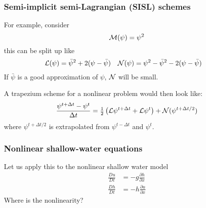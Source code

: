 \documentclass[aspectratio=43,9pt]{beamer}
\begin{document}
\begin{frame}
	\frametitle{Semi-implicit semi-Lagrangian (SISL) schemes}
	\begin{myitemize}{3ex}
		\item For example, consider
			\begin{equation*}
				{\cal M}(\psi)=\psi^2
			\end{equation*}
			this can be split up like
			\begin{align*}
				{\cal L}(\psi)&=\bar\psi^2+2(\psi-\bar{\psi})	& {\cal N}(\psi)&=\psi^2-\bar\psi^2-2(\psi-\bar{\psi})
			\end{align*}
			If $\bar \psi$ is a good approximation of $\psi$, $\cal N$ will be small.
		\item A trapezium scheme for a nonlinear problem would then look like:
			\begin{equation*}
				\frac{\psi^{t+\Delta t} - \psi^t}{\Delta t} =
				{\textstyle\frac{1}{2}} \left(  {\cal L} \psi^{t+\Delta t} + {\cal L}\psi^{t} \right)
				+ {\cal N}(\psi^{t+\Delta t/2})
			\end{equation*}
			where $\psi^{t+\Delta t/2}$ is extrapolated from $\psi^{t-\Delta t}$ and $\psi^t$.
	\end{myitemize}
\end{frame}
%
%
\begin{frame}
	\frametitle{Nonlinear shallow-water equations}
	\begin{myitemize}{2ex}
		\item Let us apply this to the nonlinear shallow water model
			\begin{align*}
				\frac{D u}{D t} &= -g \frac{\partial h}{\partial x} \\
				\frac{D h}{D t} &= - h \frac{\partial u}{\partial x}
			\end{align*}
			Where is the nonlinearity?
	\end{myitemize}
\end{frame}
%
%
\end{document}
